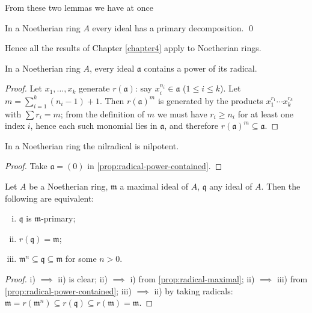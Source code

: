 From these two lemmas we have at once

\begin{theorem}\label{thm:lasker-noether}
In a Noetherian ring $A$ every ideal has a primary decomposition. \qed
\end{theorem}

Hence all the results of Chapter \ref{chapter4} apply to Noetherian rings.

\begin{proposition}\label{prop:radical-power-contained}
In a Noetherian ring $A$, every ideal $\mathfrak{a}$ contains a power of its radical.
\end{proposition}

\begin{proof}
Let $x_1, \ldots, x_k$ generate $r(\mathfrak{a})$: say $x_i^{n_i} \in \mathfrak{a}$ ($1 \leq i \leq k$). Let $m = \sum_{i=1}^k (n_i - 1) + 1$. Then $r(\mathfrak{a})^m$ is generated by the products $x_1^{r_1} \cdots x_k^{r_k}$ with $\sum r_i = m$; from the definition of $m$ we must have $r_i \geq n_i$ for at least one index $i$, hence each such monomial lies in $\mathfrak{a}$, and therefore $r(\mathfrak{a})^m \subseteq \mathfrak{a}$.
\end{proof}

\begin{corollary}\label{cor:nilradical-nilpotent}
In a Noetherian ring the nilradical is nilpotent.
\end{corollary}

\begin{proof}
Take $\mathfrak{a} = (0)$ in \eqref{prop:radical-power-contained}.
\end{proof}

\begin{corollary}\label{cor:m-primary-equivalent}
Let $A$ be a Noetherian ring, $\mathfrak{m}$ a maximal ideal of $A$, $\mathfrak{q}$ any ideal of $A$. Then the following are equivalent:
\begin{enumerate}[i)]
    \item $\mathfrak{q}$ is $\mathfrak{m}$-primary;
    \item $r(\mathfrak{q}) = \mathfrak{m}$;
    \item $\mathfrak{m}^n \subseteq \mathfrak{q} \subseteq \mathfrak{m}$ for some $n > 0$.
\end{enumerate}
\end{corollary}

\begin{proof}
i) $\implies$ ii) is clear; ii) $\implies$ i) from \eqref{prop:radical-maximal}; ii) $\implies$ iii) from \eqref{prop:radical-power-contained}; iii) $\implies$ ii) by taking radicals: $\mathfrak{m} = r(\mathfrak{m}^n) \subseteq r(\mathfrak{q}) \subseteq r(\mathfrak{m}) = \mathfrak{m}$.
\end{proof}

